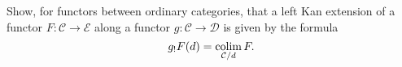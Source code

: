 \documentclass{amsart}
\begin{document}
\begin{exercise}
    Show, for functors between ordinary categories, that a left Kan extension of a
    functor $F:\mathcal{C}\to \mathcal{E}$ along a functor $g:\mathcal{C}\to \mathcal{D}$
    is given by the formula
    \begin{equation*}
        g_!F(d) = \operatorname*{colim}_{\mathcal{C}/d} F.
    \end{equation*}
\end{exercise}


\newpage




\end{document}
